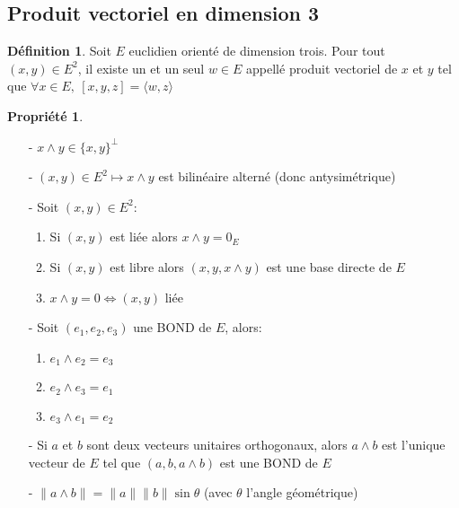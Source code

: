 \documentclass[fleqn]{article}
\theoremstyle{definition} \newtheorem*{defi}{D\'efinition}
\theoremstyle{definition} \newtheorem*{theo}{Th\'eor\`eme}
\theoremstyle{definition} \newtheorem*{coro}{Corollaire}
\theoremstyle{remark} \newtheorem*{rqs}{Remarques}
\theoremstyle{definition} \newtheorem*{prop}{Propri\'et\'e}
\begin{document}
\subsection{Produit vectoriel en dimension 3}

\begin{defi}
	Soit $E$ euclidien orient\'e de dimension trois. Pour tout $(x,y) \in E^2$, il existe un et un seul $w \in E$ appell\'e produit vectoriel de
	$x$ et $y$ tel que $\forall x \in E,\ [x,y,z] = \langle w,z \rangle$
\end{defi}

\begin{prop} $ $
	\begin{enumerate}
		\item [-] $x \wedge y \in \{x,y\}^\perp$
		\item [-] $(x,y) \in E^2 \mapsto x \wedge y$ est bilin\'eaire altern\'e (donc antysim\'etrique)
		\item [-] Soit $(x,y) \in E^2$:
			\begin{enumerate}
				\item Si $(x,y)$ est li\'ee alors $x \wedge y = 0_E$
				\item Si $(x,y)$ est libre alors $(x,y,x \wedge y)$ est une base directe de $E$
				\item $x \wedge y = 0 \Leftrightarrow (x,y)$ li\'ee
			\end{enumerate}
		\item [-] Soit $(e_1, e_2, e_3)$ une BOND de $E$, alors:
			\begin{enumerate}
				\item $e_1 \wedge e_2 = e_3$
				\item $e_2 \wedge e_3 = e_1$
				\item $e_3 \wedge e_1 = e_2$
			\end{enumerate}
		\item [-] Si $a$ et $b$ sont deux vecteurs unitaires orthogonaux, alors $a \wedge b$ est l'unique vecteur de $E$ tel que
			$(a,b,a \wedge b)$ est une BOND de $E$
		\item [-] $\| a \wedge b \| = \|a\| \|b\| \sin \theta$ (avec $\theta$ l'angle g\'eom\'etrique)
	\end{enumerate}
\end{prop}
\end{document}
